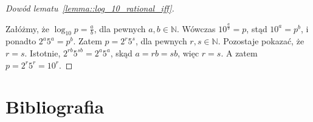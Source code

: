 \documentclass[aspectratio=169]{beamer}
\newcommand{\N}{\mathbb{N}}
\begin{document}
\begin{frame}
  \begin{proof}[Dowód lematu~\ref{lemma::log_10_rational_iff}]
    \hypertarget{proof::lemma::log_10_rational_iff}{}
    Załóżmy, że $\log_{10}p = \frac{a}{b}$, dla pewnych $a, b \in \N$.
    Wówczas $10^{\frac{a}{b}} = p$, stąd $10^a = p^b$, i ponadto $2^a5^a = p^b$.
    Zatem $p = 2^r5^s$, dla pewnych $r, s \in \N$.
    Pozostaje pokazać, że $r = s$.
    Istotnie, $2^{rb}5^{sb} = 2^a5^a$, skąd $a = rb = sb$, więc $r=s$.
    A zatem $p = 2^r5^r = 10^r$.
  \end{proof}
\end{frame}

\section{Bibliografia}
\begin{frame}
  {}
  
\end{frame}
\end{document}

